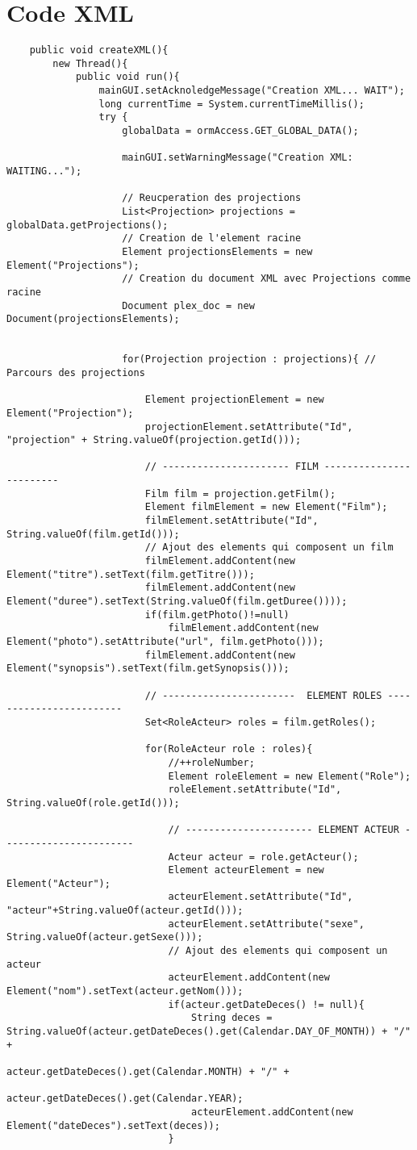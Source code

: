 \documentclass[a4paper]{article} %
\begin{document}
\section{Code XML}
\begin{lstlisting}
	public void createXML(){
		new Thread(){
			public void run(){
				mainGUI.setAcknoledgeMessage("Creation XML... WAIT");
				long currentTime = System.currentTimeMillis();
				try {
					globalData = ormAccess.GET_GLOBAL_DATA();

					mainGUI.setWarningMessage("Creation XML: WAITING...");

					// Reucperation des projections
					List<Projection> projections = globalData.getProjections();
					// Creation de l'element racine
					Element projectionsElements = new Element("Projections");
					// Creation du document XML avec Projections comme racine
					Document plex_doc = new Document(projectionsElements);


					for(Projection projection : projections){ // Parcours des projections

						Element projectionElement = new Element("Projection");
						projectionElement.setAttribute("Id", "projection" + String.valueOf(projection.getId()));

						// ---------------------- FILM ------------------------
						Film film = projection.getFilm();
						Element filmElement = new Element("Film");
						filmElement.setAttribute("Id", String.valueOf(film.getId()));
						// Ajout des elements qui composent un film
						filmElement.addContent(new Element("titre").setText(film.getTitre()));
						filmElement.addContent(new Element("duree").setText(String.valueOf(film.getDuree())));
						if(film.getPhoto()!=null)
							filmElement.addContent(new Element("photo").setAttribute("url", film.getPhoto()));
						filmElement.addContent(new Element("synopsis").setText(film.getSynopsis()));

						// -----------------------	ELEMENT ROLES ------------------------
						Set<RoleActeur> roles = film.getRoles();

						for(RoleActeur role : roles){
							//++roleNumber;
							Element roleElement = new Element("Role");
							roleElement.setAttribute("Id", String.valueOf(role.getId()));

							// ---------------------- ELEMENT ACTEUR -----------------------
							Acteur acteur = role.getActeur();
							Element acteurElement = new Element("Acteur");
							acteurElement.setAttribute("Id", "acteur"+String.valueOf(acteur.getId()));
							acteurElement.setAttribute("sexe", String.valueOf(acteur.getSexe()));
							// Ajout des elements qui composent un acteur
							acteurElement.addContent(new Element("nom").setText(acteur.getNom()));
							if(acteur.getDateDeces() != null){
								String deces = String.valueOf(acteur.getDateDeces().get(Calendar.DAY_OF_MONTH)) + "/" +
										acteur.getDateDeces().get(Calendar.MONTH) + "/" +
										acteur.getDateDeces().get(Calendar.YEAR);
								acteurElement.addContent(new Element("dateDeces").setText(deces));
							}


\end{lstlisting}
\end{document}
